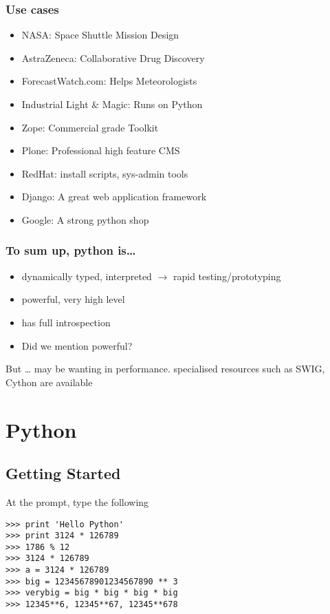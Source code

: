 \documentclass[14pt,compress]{beamer}
\newcounter{time}
\newcommand{\inctime}[1]{\addtocounter{time}{#1}{\tiny \thetime\ m}}
\begin{document}
\begin{frame}
  \frametitle{Use cases}
  \begin{itemize}
  \item NASA: Space Shuttle Mission Design
  \item AstraZeneca: Collaborative Drug Discovery
  \item ForecastWatch.com: Helps Meteorologists
  \item Industrial Light \& Magic: Runs on Python
  \item Zope: Commercial grade Toolkit
  \item Plone: Professional high feature CMS
  \item RedHat: install scripts, sys-admin tools
  \item Django: A great web application framework
  \item Google: A strong python shop
  \end{itemize}
\end{frame}

\begin{frame}
  \frametitle{To sum up, python is\ldots}
  \begin{itemize}
  \item dynamically typed, interpreted $\rightarrow$ rapid testing/prototyping
  \item powerful, very high level
  \item has full introspection 
  \item Did we mention powerful?
  \end{itemize}
  \begin{block}{But \ldots}
    may be wanting in performance. specialised resources such as SWIG, \alert{Cython} are available 
  \end{block}
  \inctime{15}
\end{frame}


\section{Python}

\subsection{Getting Started}

\begin{frame}[fragile]{At the prompt, type the following}
   \begin{lstlisting}
>>> print 'Hello Python' 
>>> print 3124 * 126789
>>> 1786 % 12
>>> 3124 * 126789
>>> a = 3124 * 126789
>>> big = 12345678901234567890 ** 3
>>> verybig = big * big * big * big 
>>> 12345**6, 12345**67, 12345**678
  \end{lstlisting}
\end{frame}
\end{document}
